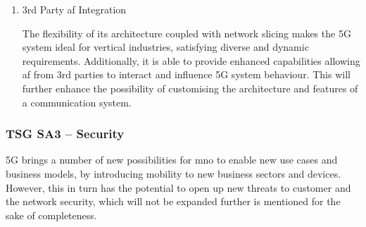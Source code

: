 \begin{enumerate}
%        
%        
%        

        \item 3rd Party \acrfull{af} Integration
        
        The flexibility of its architecture coupled with  network slicing makes the 5G system ideal for vertical industries, satisfying diverse and dynamic requirements. Additionally, it is able to provide enhanced capabilities allowing \acrshort{af} from 3rd parties to interact and influence 5G system behaviour. This will further enhance the possibility of customising the architecture and features of a communication system.

        \end{enumerate}

        \subsubsection{TSG SA3 – Security}
        5G brings a number of new possibilities for \acrfull{mno} to enable new use cases and business models, by introducing mobility to new business sectors and devices. However, this in turn has the potential to open up new threats to customer and the network security, which will not be expanded further is mentioned for the sake of completeness.

